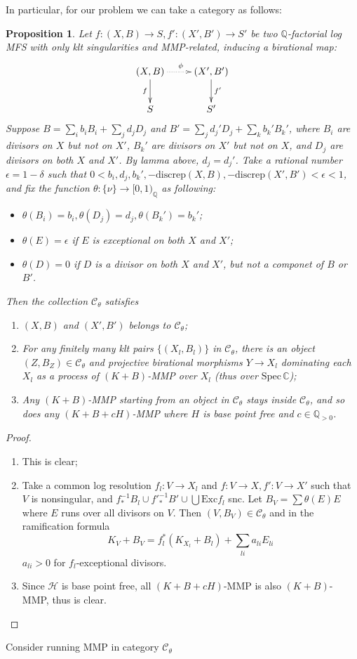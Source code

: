 \documentclass{article}
\newtheorem{prop}[defn]{Proposition}
\begin{document}
In particular, for our problem we can take a category as follows:
\begin{prop}\label{cat}
  Let $ f:(X,B)\to S,f':(X',B')\to S' $ be two $ \mathbb{Q} $-factorial log MFS  with only klt singularities and MMP-related, inducing a birational map:
  $$ \xymatrix{
    (X,B)\ar[d]_f\ar@{.>}[r]^\phi&(X',B')\ar[d]^{f'}\\
    S&S'} $$
  Suppose  $ B=\sum_ib_iB_i+\sum_jd_jD_j $ and $ B'=\sum_jd_j'D_j+\sum_kb_k'B_k' $, where $ B_i $ are divisors on $ X $ but not on $ X' $, $ B_k' $ are divisors on $ X' $ but not on $ X $, and $ D_j $ are divisors on both $ X $ and $ X' $. By lamma above, $ d_j=d_j' $. Take a rational number $ \epsilon=1-\delta $ such that $ 0<b_i,d_j,b_k', -\mathrm{discrep}(X,B),-\mathrm{discrep}(X',B')<\epsilon<1 $, and fix the function $ \theta:\{\nu\}\to [0,1)_\mathbb{Q} $ as following:
  \begin{itemize}
    \item $ \theta(B_i)=b_i, \theta(D_j)=d_j,\theta(B_k')=b_k'$;
    \item $ \theta(E)=\epsilon $ if $ E $ is exceptional on both $ X $ and $ X' $;
    \item $ \theta(D)=0 $ if $ D $ is a divisor on both $ X $ and $ X' $, but not a componet of $ B $ or $ B' $.
  \end{itemize}
  Then the collection $ \mathcal{C}_\theta $ satisfies
  \begin{enumerate}[1)]
    \item $ (X,B) $ and $ (X',B') $ belongs to $ \mathcal{C}_\theta $;
    \item For any finitely many klt pairs $ \{(X_l,B_l)\} $ in $ \mathcal{C}_\theta $, there is an object $ (Z,B_Z)\in \mathcal{C}_\theta $ and projective birational morphisms $ Y\to X_l $ dominating each      $ X_l $ as a process of $ (K+B) $-MMP over $ X_l $ (thus over $ \mathrm{Spec}\,\mathbb{C} $);
    \item Any $ (K+B) $-MMP starting from an object in $ \mathcal{C}_\theta $ stays inside $ \mathcal{C}_\theta $, and so does any $ (K+B+cH) $-MMP where $ H $ is base point free and $ c\in \mathbb{Q}_{>0} $. 
  \end{enumerate}
\end{prop}

\begin{proof}
  \begin{enumerate}
    \item This is clear;
    \item Take a common log resolution $ f_l:V\to X_l $ and $ f:V\to X, f':V\to X' $ such that $ V $ is nonsingular, and $ f_{*}^{-1}B_l\cup f'^{-1}_*B'\cup\bigcup\mathrm{Exc}f_l $ snc. Let $ B_V=\sum\theta(E)E $ where $ E $ runs over all divisors on $ V $. Then $ (V,B_V)\in \mathcal{C}_\theta $ and in the ramification formula
    $$ K_V+B_V=f_l^*(K_{X_l}+B_l)+\sum_{li}a_{li}E_{li} $$
    $ a_{li}>0 $ for $ f_l $-exceptional divisors.
    \item Since $ \mathcal{H} $ is base point free, all $ (K+B+cH) $-MMP is also $ (K+B) $-MMP, thus is clear.
  \end{enumerate}
\end{proof}
Consider running MMP in category $ \mathcal{C}_\theta $
\end{document}
